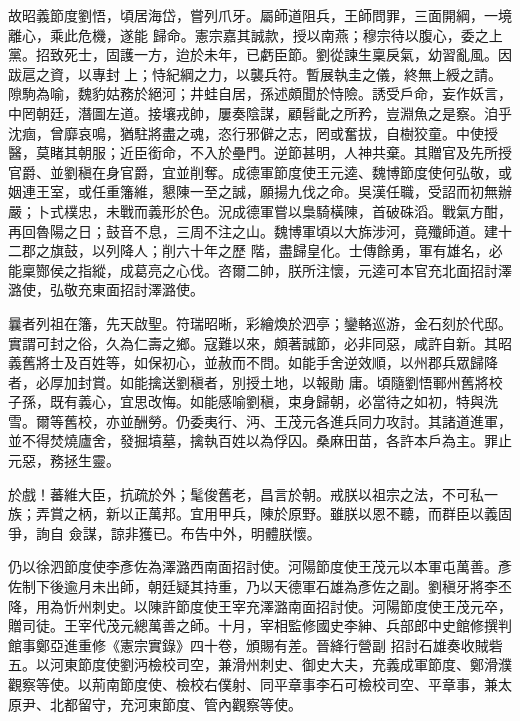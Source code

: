 \begin{pinyinscope}
 故昭義節度劉悟，頃居海岱，嘗列爪牙。屬師道阻兵，王師問罪，三面開綱，一境離心，乘此危機，遂能
 歸命。憲宗嘉其誠款，授以南燕；穆宗待以腹心，委之上黨。招致死士，固護一方，迨於未年，已虧臣節。劉從諫生稟戾氣，幼習亂風。因跋扈之資，以專封上；恃紀綱之力，以襲兵符。暫展執圭之儀，終無上綬之請。隙駒為喻，魏豹姑務於絕河；井蛙自居，孫述頗聞於恃險。誘受戶命，妄作妖言，中罔朝廷，潛圖左道。接壤戎帥，屢奏陰謀，顧髫齔之所矜，豈淵魚之是察。洎乎沈痼，曾靡哀鳴，猶駐將盡之魂，恣行邪僻之志，罔或奮拔，自樹狡童。中使授
 醫，莫睹其朝服；近臣銜命，不入於壘門。逆節甚明，人神共棄。其贈官及先所授官爵、並劉稹在身官爵，宜並削奪。成德軍節度使王元逵、魏博節度使何弘敬，或姻連王室，或任重籓維，懇陳一至之誠，願揚九伐之命。吳漢任職，受詔而初無辦嚴；卜式樸忠，未戰而義形於色。況成德軍嘗以梟騎橫陳，首破硃滔。戰氣方酣，再回魯陽之日；鼓音不息，三周不注之山。魏博軍頃以大旆涉河，竟殲師道。建十二郡之旗鼓，以列降人；削六十年之歷
 階，盡歸皇化。士傳餘勇，軍有雄名，必能稟酂侯之指縱，成葛亮之心伐。咨爾二帥，朕所注懷，元逵可本官充北面招討澤潞使，弘敬充東面招討澤潞使。



 曩者列祖在籓，先天啟聖。符瑞昭晰，彩繪煥於泗亭；鑾輅巡游，金石刻於代邸。實謂可封之俗，久為仁壽之鄉。寇難以來，頗著誠節，必非同惡，咸許自新。其昭義舊將士及百姓等，如保初心，並赦而不問。如能手舍逆效順，以州郡兵眾歸降者，必厚加封賞。如能擒送劉稹者，別授土地，以報勛
 庸。頃隨劉悟鄆州舊將校子孫，既有義心，宜思改悔。如能感喻劉稹，束身歸朝，必當待之如初，特與洗雪。爾等舊校，亦並酬勞。仍委夷行、沔、王茂元各進兵同力攻討。其諸道進軍，並不得焚燒廬舍，發掘墳墓，擒執百姓以為俘囚。桑麻田苗，各許本戶為主。罪止元惡，務拯生靈。



 於戲！蕃維大臣，抗疏於外；髦俊舊老，昌言於朝。戒朕以祖宗之法，不可私一族；弄賞之柄，新以正萬邦。宜用甲兵，陳於原野。雖朕以恩不聽，而群臣以義固爭，詢自
 僉謀，諒非獲已。布告中外，明體朕懷。



 仍以徐泗節度使李彥佐為澤潞西南面招討使。河陽節度使王茂元以本軍屯萬善。彥佐制下後逾月未出師，朝廷疑其持重，乃以天德軍石雄為彥佐之副。劉稹牙將李丕降，用為忻州刺史。以陳許節度使王宰充澤潞南面招討使。河陽節度使王茂元卒，贈司徒。王宰代茂元總萬善之師。十月，宰相監修國史李紳、兵部郎中史館修撰判館事鄭亞進重修《憲宗實錄》四十卷，頒賜有差。晉絳行營副
 招討石雄奏收賊砦五。以河東節度使劉沔檢校司空，兼滑州刺史、御史大夫，充義成軍節度、鄭滑濮觀察等使。以荊南節度使、檢校右僕射、同平章事李石可檢校司空、平章事，兼太原尹、北都留守，充河東節度、管內觀察等使。




\end{pinyinscope}
